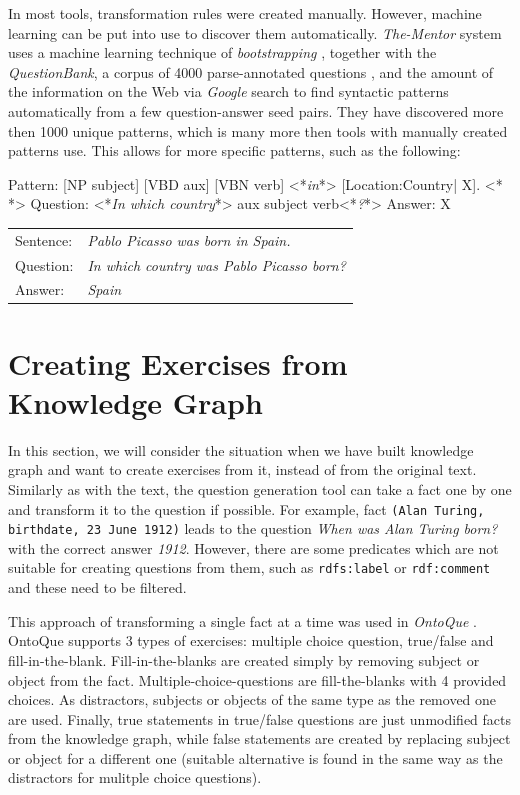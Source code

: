 \documentclass[a4paper, 12pt, twoside]{fithesis2}		%
\makeatletter
\renewcommand{\_}{\leavevmode \kern0.07em\vbox{\hrule width0.4em}}
\newcommand{\arrowlinesplit}{%
  \noindent\makebox[\linewidth]{\raisebox{0.15em}{\rule{0.478\textwidth}{0.5pt}}%
  ~$\downarrow$~%
  \noindent\raisebox{0.15em}{\rule{0.478\textwidth}{0.5pt}}}%
}
\newcounter{choice}
\newcommand{\transformationExample}[3]{%
\vspace{-0.5em}
\noindent %
\begin{tabularx}{\linewidth}{@{} l X @{}}
Sentence: & \emph{#1}\\
Question: & \emph{#2}\\
Answer:   & \emph{#3}\\
  \hline
\end{tabularx}
}
\makeatother
\begin{document}
In most tools, transformation rules were created manually.
However, machine learning can be put into use to discover them automatically.
\textit{The-Mentor} system \cite{mentor}
uses a machine learning technique of \textit{bootstrapping} \cite{question-answering-bootstrapping},
together with the \textit{QuestionBank}, a corpus of 4000 parse-annotated questions \cite{question-bank},
and the amount of the information on the Web via \textit{Google} search
to find syntactic patterns automatically from a few question-answer seed pairs.
They have discovered more then 1000 unique patterns, which is many more then tools with manually created patterns use. This allows for more specific patterns, such as the following:
\begin{code}
Pattern: [NP subject] [VBD aux] [VBN verb] <*\emph{in}*> [Location:Country| X].
<*\arrowlinesplit*>
Question: <*\emph{In which country}*> aux subject verb<*\emph{?}*>
Answer: X
\end{code}
\transformationExample%
{Pablo Picasso was born in Spain.}%
{In which country was Pablo Picasso born?}%
{Spain}


\section{Creating Exercises from Knowledge Graph}
\label{sec:exercises-from-knowledge-graph}

In this section, we will consider the situation when we have built knowledge graph
and want to create exercises from it, instead of from the original text.
Similarly as with the text, the question generation tool can take a fact one by one
and transform it to the question if possible.
For example, fact \texttt{(Alan Turing, birthdate, 23 June 1912)} leads to the question
\textit{When was Alan Turing born?} with the correct answer \textit{1912}.
However, there are some predicates which are not suitable for creating questions from them,
such as \texttt{rdfs:label} or \texttt{rdf:comment} and these need to be filtered.

This approach of transforming a single fact at a time was used in \textit{OntoQue} \cite{ontoque}.
OntoQue supports 3 types of exercises: multiple choice question, true/false and fill-in-the-blank.
Fill-in-the-blanks are created simply by removing subject or object from the fact.
Multiple-choice-questions are fill-the-blanks with 4 provided choices.
As distractors, subjects or objects of the same type as the removed one are used.
Finally, true statements in true/false questions are just unmodified facts from the knowledge graph,
while false statements are created by replacing subject or object for a different one (suitable alternative is found in the same way as the distractors for mulitple choice questions).
\end{document}
